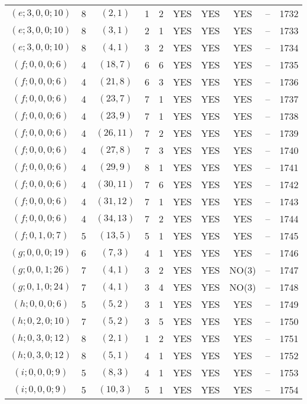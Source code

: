 \begin{longtable}{|c|c|c|c|c|c|c|c|c|c|}
$(e; 3, 0, 0; 10)$ & 8 & $(2, 1)$ & 1 & 2 & YES & YES & YES & -- & 1732\\
$(e; 3, 0, 0; 10)$ & 8 & $(3, 1)$ & 2 & 1 & YES & YES & YES & -- & 1733\\
$(e; 3, 0, 0; 10)$ & 8 & $(4, 1)$ & 3 & 2 & YES & YES & YES & -- & 1734\\
$(f; 0, 0, 0; 6)$ & 4 & $(18, 7)$ & 6 & 6 & YES & YES & YES & -- & 1735\\
$(f; 0, 0, 0; 6)$ & 4 & $(21, 8)$ & 6 & 3 & YES & YES & YES & -- & 1736\\
$(f; 0, 0, 0; 6)$ & 4 & $(23, 7)$ & 7 & 1 & YES & YES & YES & -- & 1737\\
$(f; 0, 0, 0; 6)$ & 4 & $(23, 9)$ & 7 & 1 & YES & YES & YES & -- & 1738\\
$(f; 0, 0, 0; 6)$ & 4 & $(26, 11)$ & 7 & 2 & YES & YES & YES & -- & 1739\\
$(f; 0, 0, 0; 6)$ & 4 & $(27, 8)$ & 7 & 3 & YES & YES & YES & -- & 1740\\
$(f; 0, 0, 0; 6)$ & 4 & $(29, 9)$ & 8 & 1 & YES & YES & YES & -- & 1741\\
$(f; 0, 0, 0; 6)$ & 4 & $(30, 11)$ & 7 & 6 & YES & YES & YES & -- & 1742\\
$(f; 0, 0, 0; 6)$ & 4 & $(31, 12)$ & 7 & 1 & YES & YES & YES & -- & 1743\\
$(f; 0, 0, 0; 6)$ & 4 & $(34, 13)$ & 7 & 2 & YES & YES & YES & -- & 1744\\
$(f; 0, 1, 0; 7)$ & 5 & $(13, 5)$ & 5 & 1 & YES & YES & YES & -- & 1745\\
$(g; 0, 0, 0; 19)$ & 6 & $(7, 3)$ & 4 & 1 & YES & YES & YES & -- & 1746\\
$(g; 0, 0, 1; 26)$ & 7 & $(4, 1)$ & 3 & 2 & YES & YES & NO(3) & -- & 1747\\
$(g; 0, 1, 0; 24)$ & 7 & $(4, 1)$ & 3 & 4 & YES & YES & NO(3) & -- & 1748\\
$(h; 0, 0, 0; 6)$ & 5 & $(5, 2)$ & 3 & 1 & YES & YES & YES & -- & 1749\\
$(h; 0, 2, 0; 10)$ & 7 & $(5, 2)$ & 3 & 5 & YES & YES & YES & -- & 1750\\
$(h; 0, 3, 0; 12)$ & 8 & $(2, 1)$ & 1 & 2 & YES & YES & YES & -- & 1751\\
$(h; 0, 3, 0; 12)$ & 8 & $(5, 1)$ & 4 & 1 & YES & YES & YES & -- & 1752\\
$(i; 0, 0, 0; 9)$ & 5 & $(8, 3)$ & 4 & 1 & YES & YES & YES & -- & 1753\\
$(i; 0, 0, 0; 9)$ & 5 & $(10, 3)$ & 5 & 1 & YES & YES & YES & -- & 1754\\

\end{longtable}
